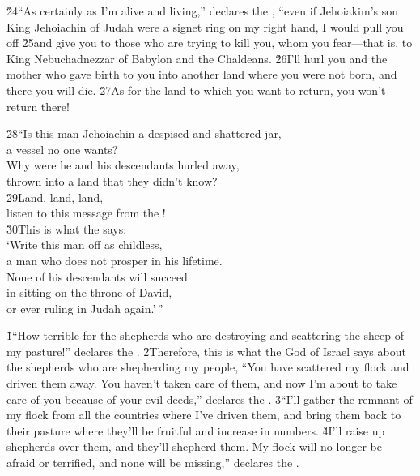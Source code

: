 \v{24}``As certainly as I'm alive and living,'' declares the , ``even if Jehoiakim's son King Jehoiachin of Judah were a signet ring on my right hand, I would pull you off \v{25}and give you to those who are trying to kill you, whom you fear---that is, to King Nebuchadnezzar of Babylon and the Chaldeans. \v{26}I'll hurl you and the mother who gave birth to you into another land where you were not born, and there you will die. \v{27}As for the land to which you want to return, you won't return there!

\begin{poetry}
\poeml \v{28}``Is this man Jehoiachin a despised and shattered jar, \\
\poemll    a vessel no one wants? \\
\poeml Why were he and his descendants hurled away, \\
\poemll    thrown into a land that they didn't know? \\
\poeml \v{29}Land, land, land, \\
\poemll    listen to this message from the ! \\
\poeml \v{30}This is what the  says: \\
\poeml `Write this man off as childless, \\
\poemll    a man who does not prosper in his lifetime. \\
\poeml None of his descendants will succeed \\
\poemll    in sitting on the throne of David, \\
\poemlll       or ever ruling in Judah again.'\,''
\end{poetry}

\v{1}``How terrible for the shepherds who are destroying and scattering the sheep of my pasture!'' declares the . \v{2}Therefore, this is what the  God of Israel says about the shepherds who are shepherding my people, ``You have scattered my flock and driven them away. You haven't taken care of them, and now I'm about to take care of you because of your evil deeds,'' declares the . \v{3}``I'll gather the remnant of my flock from all the countries where I've driven them, and bring them back to their pasture where they'll be fruitful and increase in numbers. \v{4}I'll raise up shepherds over them, and they'll shepherd them. My flock will no longer be afraid or terrified, and none will be missing,'' declares the .

